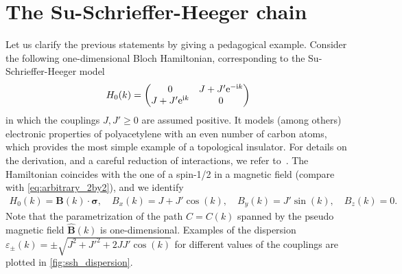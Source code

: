 \section{The Su-Schrieffer-Heeger chain}
\label{sec:the_SSH_chain}
%
%
Let us clarify the previous statements by giving a pedagogical example.
Consider the following one-dimensional Bloch Hamiltonian, corresponding to the Su-Schrieffer-Heeger model
\begin{align}
    H_0(k)
    =
    \begin{pmatrix}
        0 & J+J'\mathrm e^{-\mathrm i k}\\
        J+J'\mathrm e^{\mathrm i k} & 0
    \end{pmatrix}
    \label{eq:SSH_momentum_space}
\end{align}
in which the couplings $J,J'\geq0$ are assumed positive.
It models (among others) electronic properties of poly\-acetylene with an even number of carbon atoms, which provides the most simple example of a topological insulator.
For details on the derivation, and a careful reduction of interactions, we refer to~\cite{Heeger1988}.
The Hamiltonian coincides with the one of a spin-1/2 in a magnetic field (compare with \ref{eq:arbitrary_2by2}), and we identify
\begin{align}
    H_0(k) = {\bm B}(k)\cdot{\bm\sigma},
    \quad
    B_x(k) = J+J'\cos(k),
    \quad
    B_y(k) = J'\sin(k),
    \quad
    B_z(k) = 0.
\end{align}
Note that the parametrization of the path $C=C(k)$ spanned by the pseudo magnetic field $\hat{\bm B}(k)$ is one-dimensional.
Examples of the dispersion $\varepsilon_\pm(k)=\pm\sqrt{J^2+J'^2+2JJ'\cos(k)}$ for different values of the couplings are plotted in \cref{fig:ssh_dispersion}.
